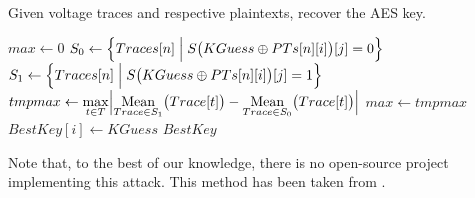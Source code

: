 \begin{alg}
\label{alg:bitwisedpa}
Given voltage traces and respective plaintexts, recover the AES key.
	\begin{algorithmic}[1]
				\State $max \gets 0$
						\State $S_0 \gets \Bigl\{ Traces[n] \Bigm| S\bigl(KGuess\oplus PTs[n][i]\bigr)[j] = 0 \Bigr\}$
						\State $S_1 \gets \Bigl\{ Traces[n] \Bigm| S\bigl(KGuess\oplus PTs[n][i]\bigr)[j] = 1 \Bigr\}$
						\State $tmpmax \gets \max\limits_{t\in T} \Bigl| \operatorname*{Mean}\limits_{Trace\in S_1}\bigl(Trace[t]\bigr) - \operatorname*{Mean}\limits_{Trace\in S_0}\bigl(Trace[t]\bigr) \Bigr|$
							\State $max \gets tmpmax$
							\State $BestKey[i] \gets KGuess$
						\EndIf
					\EndFor
				\EndFor
			\EndFor
			\State\Return $BestKey$
		\EndFunction
	\end{algorithmic}
\end{alg}

Note that, to the best of our knowledge, there is no open-source project implementing this attack. This method has been taken from \cite{teuwen2015movfuscator}.

